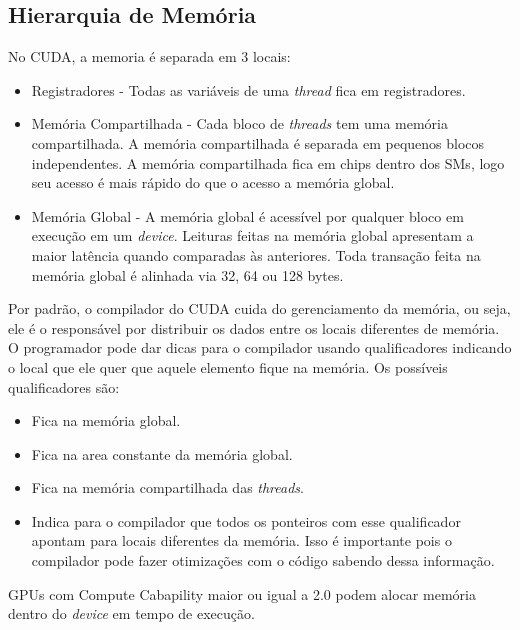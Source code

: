 \subsection{Hierarquia de Memória}
No CUDA, a memoria é separada em 3 locais:

\begin{itemize}
  \item Registradores - Todas as variáveis de uma \textit{thread} fica em registradores.
  \item Memória Compartilhada - Cada bloco de \textit{threads} tem uma memória compartilhada. A memória compartilhada é separada em
          pequenos blocos independentes. A memória compartilhada fica em chips dentro dos SMs, logo seu acesso é mais rápido do que o acesso a
          memória global.
  \item Memória Global - A memória global é acessível por qualquer bloco em execução em um \textit{device}.
        Leituras feitas na memória global apresentam a maior latência quando comparadas às anteriores.
        Toda transação feita na memória global é alinhada via 32, 64 ou 128 bytes.

\end{itemize}

Por padrão, o compilador do CUDA cuida do gerenciamento da memória, ou seja, ele é o responsável por distribuir os dados
entre os locais diferentes de memória. O programador pode dar dicas para o compilador usando qualificadores indicando o local
que ele quer que aquele elemento fique na memória. Os possíveis qualificadores são:
\begin{itemize}
  \item {} Fica na memória global.
  \item {} Fica na area constante da memória global.
  \item {} Fica na memória compartilhada das \textit{threads}.
  \item {} Indica para o compilador que todos os ponteiros com esse qualificador apontam para locais diferentes
                            da memória. Isso é importante pois o compilador pode fazer otimizações com o código sabendo dessa informação.
\end{itemize}

GPUs com Compute Cabapility maior ou igual a 2.0 podem alocar memória dentro do \textit{device} em tempo de execução.
